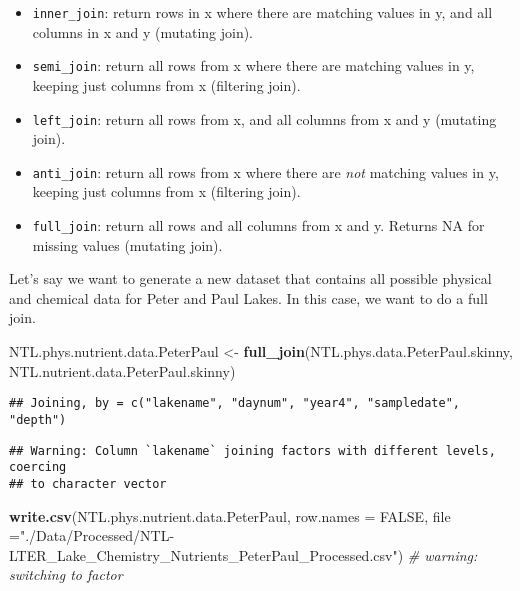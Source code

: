 \documentclass[]{article}
\newenvironment{Shaded}{\begin{snugshade}}{\end{snugshade}}
\newcommand{\KeywordTok}[1]{\textcolor[rgb]{0.13,0.29,0.53}{\textbf{#1}}}
\newcommand{\DataTypeTok}[1]{\textcolor[rgb]{0.13,0.29,0.53}{#1}}
\newcommand{\StringTok}[1]{\textcolor[rgb]{0.31,0.60,0.02}{#1}}
\newcommand{\CommentTok}[1]{\textcolor[rgb]{0.56,0.35,0.01}{\textit{#1}}}
\newcommand{\OtherTok}[1]{\textcolor[rgb]{0.56,0.35,0.01}{#1}}
\newcommand{\NormalTok}[1]{#1}
\providecommand{\tightlist}{%
  \setlength{\itemsep}{0pt}\setlength{\parskip}{0pt}}
\begin{document}
\begin{itemize}
\tightlist
\item
  \texttt{inner\_join}: return rows in x where there are matching values
  in y, and all columns in x and y (mutating join).
\item
  \texttt{semi\_join}: return all rows from x where there are matching
  values in y, keeping just columns from x (filtering join).
\item
  \texttt{left\_join}: return all rows from x, and all columns from x
  and y (mutating join).
\item
  \texttt{anti\_join}: return all rows from x where there are \emph{not}
  matching values in y, keeping just columns from x (filtering join).
\item
  \texttt{full\_join}: return all rows and all columns from x and y.
  Returns NA for missing values (mutating join).
\end{itemize}

Let's say we want to generate a new dataset that contains all possible
physical and chemical data for Peter and Paul Lakes. In this case, we
want to do a full join.

\begin{Shaded}
\begin{Highlighting}[]
\NormalTok{NTL.phys.nutrient.data.PeterPaul <-}\StringTok{ }\KeywordTok{full_join}\NormalTok{(NTL.phys.data.PeterPaul.skinny, NTL.nutrient.data.PeterPaul.skinny)}
\end{Highlighting}
\end{Shaded}

\begin{verbatim}
## Joining, by = c("lakename", "daynum", "year4", "sampledate", "depth")
\end{verbatim}

\begin{verbatim}
## Warning: Column `lakename` joining factors with different levels, coercing
## to character vector
\end{verbatim}

\begin{Shaded}
\begin{Highlighting}[]
\KeywordTok{write.csv}\NormalTok{(NTL.phys.nutrient.data.PeterPaul, }\DataTypeTok{row.names =} \OtherTok{FALSE}\NormalTok{, }
          \DataTypeTok{file =}\StringTok{"./Data/Processed/NTL-LTER_Lake_Chemistry_Nutrients_PeterPaul_Processed.csv"}\NormalTok{)}
\CommentTok{# warning: switching to factor}
\end{Highlighting}
\end{Shaded}
\end{document}
